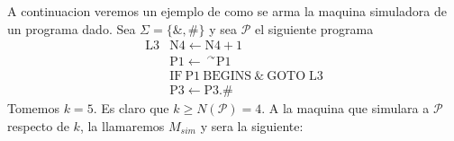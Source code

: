 \begin{frame}
  A continuacion veremos un ejemplo de como se arma la maquina
  simuladora de un programa dado. Sea $\Sigma =\{\&,\#\}$ y sea $\mathcal{P}$
  el siguiente programa%
  \begin{equation*}
  \begin{array}{ll}
  \mathrm{L}3 & \mathrm{N}4\leftarrow \mathrm{N}4+1 \\
  & \mathrm{P}1\leftarrow \ ^{\curvearrowright }\mathrm{P}1 \\
  & \mathrm{IF\ P}1\ \mathrm{BEGINS\ }\&\ \mathrm{GOTO}\;\mathrm{L}3 \\
  & \mathrm{P}3\leftarrow \mathrm{P}3.\#%
  \end{array}%
  \end{equation*}%
  Tomemos $k=5$. Es claro que $k\geq N(\mathcal{P})=4$. A la maquina que
  simulara a $\mathcal{P}$ respecto de $k$, la llamaremos $M_{sim}$ y sera la
  siguiente:
\end{frame}
